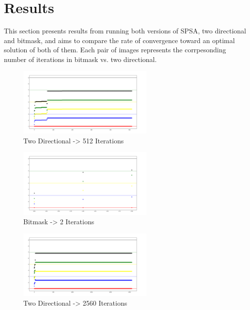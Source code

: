 \documentclass[12pt]{article}
\begin{document}
\section{Results}

This section presents results from running both versions of SPSA, two directional and bitmask, and aims to compare the rate of convergence toward an optimal solution of both of them. Each pair of images represents the corrpesonding number of iterations in bitmask vs. two directional.

\begin{figure}[htbp]
\centering
\includegraphics[width=0.6\textwidth]{Two_512.png}
\caption{Two Directional -> 512 Iterations}
\label{fig:result_1}
\end{figure}

\begin{figure}[htbp]
\centering
\includegraphics[width=0.6\textwidth]{Bitmask_2.png}
\caption{Bitmask -> 2 Iterations}
\label{fig:result_2}
\end{figure}
\begin{figure}[htbp]
\centering
\includegraphics[width=0.6\textwidth]{Two_2560.png}
\caption{Two Directional -> 2560 Iterations}
\label{fig:result_3}
\end{figure}
\end{document}
